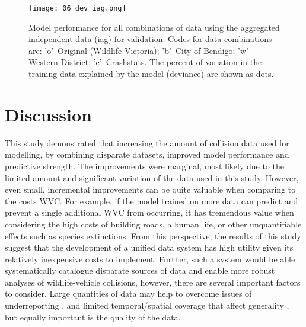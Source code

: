 \begin{figure*}[!t]
  \centering
  \texttt{[image: 06\_dev\_iag.png]}
  \caption[Model discrimination ability for all combinations of training data using the aggregated independent data for validation]{Model performance for all combinations of data using the aggregated independent data (iag) for validation. Codes for data combinations are: 'o'--Original (Wildlife Victoria); 'b'--City of Bendigo; 'w'--Western District; 'c'--Crashstats. The percent of variation in the training data explained by the model (deviance) are shown as dots.}
  \label{val_calib_dev}
\end{figure*}

\section{Discussion}

This study demonstrated that increasing the amount of collision data used for modelling, by combining disparate datasets, improved model performance and predictive strength. The improvements were marginal, most likely due to the limited amount and significant variation of the data used in this study. However, even small, incremental improvements can be quite valuable when comparing to the costs WVC. For example, if the model trained on more data can predict and prevent a single additional WVC from occurring, it has tremendous value when considering the high costs of building roads, a human life, or other unquantifiable effects such as species extinctions. From this perspective, the results of this study suggest that the development of a unified data system has high utility given its relatively inexpensive costs to implement. Further, such a system would be able systematically catalogue disparate sources of data and enable more robust analyses of wildlife-vehicle collisions, however, there are several important factors to consider. Large quantities of data may help to overcome issues of underreporting \citep{snow15}, and limited temporal/spatial coverage that affect generality \citep{clev15}, but equally important is the quality of the data.

